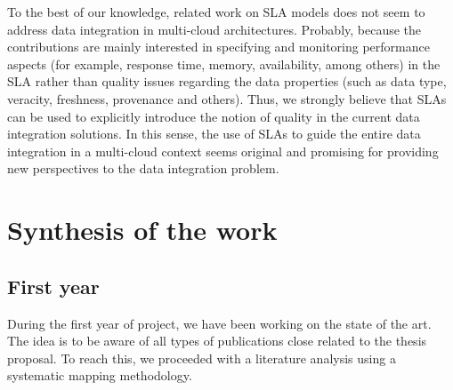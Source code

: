 To the best of our knowledge, related work on SLA models does not seem to 
address data integration in multi-cloud architectures. Probably, because the 
contributions are mainly interested in specifying and monitoring performance 
aspects (for example, response time, memory, availability, among others) in the SLA 
rather than quality issues regarding the data properties (such as data type, 
veracity, freshness, provenance and others).
Thus, we strongly believe that SLAs can be used to explicitly introduce the 
notion of quality in the current data integration solutions. 
In this sense, the use of SLAs to guide the entire data integration in a 
multi-cloud context seems original and promising for providing new perspectives to the data integration problem.




\section{Synthesis of the work}
%
%
\subsection{First year}

During the first year of project, we have been working on the state of the art. The idea is to be aware of all types of publications close related to the thesis proposal. To reach this, we proceeded with a literature analysis using a systematic mapping methodology. 
	
